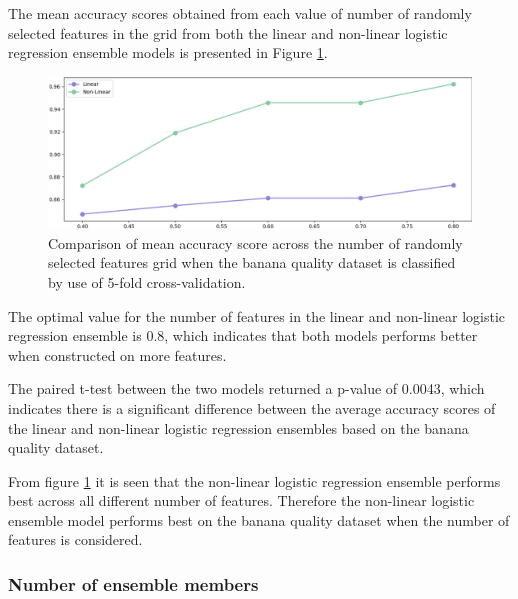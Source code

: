 \documentclass[10pt, conference]{IEEEtran}
\begin{document}
The mean accuracy scores obtained from each value of number of randomly selected features in the grid from both the linear and non-linear
logistic regression ensemble models is presented in Figure \ref{fig:BQ_features_comparison}.
\begin{figure}[H]
    \centerline{\includegraphics[scale=0.26]{../Images/BQ_features.PNG}}
    \caption{Comparison of mean accuracy score across the number of randomly selected features grid when the banana quality dataset is classified by use of 5-fold cross-validation.}
    \label{fig:BQ_features_comparison}
\end{figure}
The optimal value for the number of features in the linear and non-linear logistic regression ensemble is 0.8, which indicates
that both models performs better when constructed on more features.

The paired t-test between the two models returned a p-value of 0.0043, which indicates there is a significant difference
between the average accuracy scores of the linear and non-linear logistic regression ensembles based on the banana quality dataset.

From figure \ref{fig:BQ_features_comparison} it is seen that the non-linear logistic regression ensemble performs best across
all different number of features. Therefore the non-linear logistic ensemble model performs best on the banana quality dataset when the
number of features is considered.

\subsubsection{Number of ensemble members}
\end{document}

